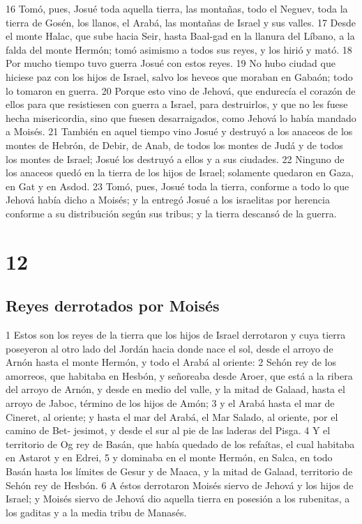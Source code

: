 16 Tomó, pues, Josué toda aquella tierra, las montañas, todo el Neguev, toda la tierra de Gosén, los llanos, el Arabá, las montañas de Israel y sus valles.
17 Desde el monte Halac, que sube hacia Seir, hasta Baal-gad en la llanura del Líbano, a la falda del monte Hermón; tomó asimismo a todos sus reyes, y los hirió y mató.
18 Por mucho tiempo tuvo guerra Josué con estos reyes.
19 No hubo ciudad que hiciese paz con los hijos de Israel, salvo los heveos que moraban en Gabaón; todo lo tomaron en guerra.
20 Porque esto vino de Jehová, que endurecía el corazón de ellos para que resistiesen con guerra a Israel, para destruirlos, y que no les fuese hecha misericordia, sino que fuesen desarraigados, como Jehová lo había mandado a Moisés. 
21 También en aquel tiempo vino Josué y destruyó a los anaceos de los montes de Hebrón, de Debir, de Anab, de todos los montes de Judá y de todos los montes de Israel; Josué los destruyó a ellos y a sus ciudades.
22 Ninguno de los anaceos quedó en la tierra de los hijos de Israel; solamente quedaron en Gaza, en Gat y en Asdod.
23 Tomó, pues, Josué toda la tierra, conforme a todo lo que Jehová había dicho a Moisés; y la entregó Josué a los israelitas por herencia conforme a su distribución según sus tribus; y la tierra descansó de la guerra.

\chapter{12}

\section*{Reyes derrotados por Moisés}


1 Estos son los reyes de la tierra que los hijos de Israel derrotaron y cuya tierra poseyeron al otro lado del Jordán hacia donde nace el sol, desde el arroyo de Arnón hasta el monte Hermón, y todo el Arabá al oriente:
2 Sehón rey de los amorreos, que habitaba en Hesbón, y señoreaba desde Aroer, que está a la ribera del arroyo de Arnón, y desde en medio del valle, y la mitad de Galaad, hasta el arroyo de Jaboc, término de los hijos de Amón;
3 y el Arabá hasta el mar de Cineret, al oriente; y hasta el mar del Arabá, el Mar Salado, al oriente, por el camino de Bet- jesimot, y desde el sur al pie de las laderas del Pisga.
4 Y el territorio de Og rey de Basán, que había quedado de los refaítas, el cual habitaba en Astarot y en Edrei, 
5 y dominaba en el monte Hermón, en Salca, en todo Basán hasta los límites de Gesur y de Maaca, y la mitad de Galaad, territorio de Sehón rey de Hesbón. 
6 A éstos derrotaron Moisés siervo de Jehová y los hijos de Israel; y Moisés siervo de Jehová dio aquella tierra en posesión a los rubenitas, a los gaditas y a la media tribu de Manasés.

